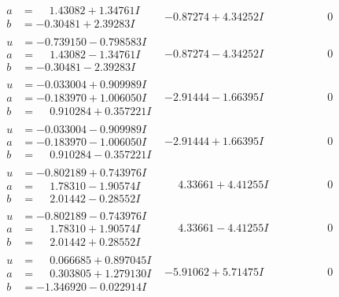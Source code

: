 \documentclass[1p]{elsarticle_modified}
\theoremstyle{definition}
\begin{document}
$$\begin{array}{c|c|c}
\begin{aligned}
a &= \phantom{-}1.43082 + 1.34761 I \\
b &= -0.30481 + 2.39283 I\end{aligned}
 & -0.87274 + 4.34252 I & \phantom{-0.000000 } 0 \\ \hline\begin{aligned}
u &= -0.739150 - 0.798583 I \\
a &= \phantom{-}1.43082 - 1.34761 I \\
b &= -0.30481 - 2.39283 I\end{aligned}
 & -0.87274 - 4.34252 I & \phantom{-0.000000 } 0 \\ \hline\begin{aligned}
u &= -0.033004 + 0.909989 I \\
a &= -0.183970 + 1.006050 I \\
b &= \phantom{-}0.910284 + 0.357221 I\end{aligned}
 & -2.91444 - 1.66395 I & \phantom{-0.000000 } 0 \\ \hline\begin{aligned}
u &= -0.033004 - 0.909989 I \\
a &= -0.183970 - 1.006050 I \\
b &= \phantom{-}0.910284 - 0.357221 I\end{aligned}
 & -2.91444 + 1.66395 I & \phantom{-0.000000 } 0 \\ \hline\begin{aligned}
u &= -0.802189 + 0.743976 I \\
a &= \phantom{-}1.78310 - 1.90574 I \\
b &= \phantom{-}2.01442 - 0.28552 I\end{aligned}
 & \phantom{-}4.33661 + 4.41255 I & \phantom{-0.000000 } 0 \\ \hline\begin{aligned}
u &= -0.802189 - 0.743976 I \\
a &= \phantom{-}1.78310 + 1.90574 I \\
b &= \phantom{-}2.01442 + 0.28552 I\end{aligned}
 & \phantom{-}4.33661 - 4.41255 I & \phantom{-0.000000 } 0 \\ \hline\begin{aligned}
u &= \phantom{-}0.066685 + 0.897045 I \\
a &= \phantom{-}0.303805 + 1.279130 I \\
b &= -1.346920 - 0.022914 I\end{aligned}
 & -5.91062 + 5.71475 I & \phantom{-0.000000 } 0 \\ \hline\begin{aligned}

\end{aligned}
\end{array}$$
\end{document}
